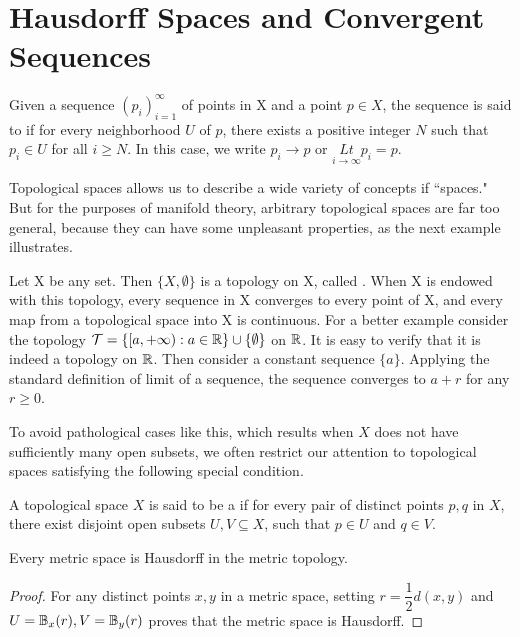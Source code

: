 \documentclass[11pt,a4paper]{article}
\begin{document}
\section{Hausdorff Spaces and Convergent Sequences}

\begin{mydef}
    Given a sequence $(p_i)_{i=1}^\infty$ of points in X and a point $p\in X$, the sequence is said to  if for every neighborhood $U$ of $p$, there exists a positive integer $N$ such that $p_i\in U$ for all $i\ge N$. In this case, we write $p_i\rightarrow p$ or $\underset{i\rightarrow\infty}{Lt} p_i=p$.
\end{mydef}

Topological spaces allows us to describe a wide variety of concepts if ``spaces." But for the purposes of manifold theory, arbitrary topological spaces are far too general, because they can have some unpleasant properties, as the next example illustrates.

\begin{example}
    Let X be any set. Then $\{X,\emptyset\}$ is a topology on X, called . When X is endowed with this topology, every sequence in X converges to every point of X, and every map from a topological space into X is continuous. For a better example consider the topology $\mathcal{T} = \{[a,+\infty):a\in\mathbb{R}\}\cup \{\emptyset\}$ on $\mathbb{R}$. It is easy to verify that it is indeed a topology on $\mathbb{R}$. Then consider a constant sequence $\{a\}$. Applying the standard definition of limit of a sequence, the sequence converges to $a+r$ for any $r\ge 0$.
\end{example}

To avoid pathological cases like this, which results when $X$ does not have sufficiently many open subsets, we often restrict our attention to topological spaces satisfying the following special condition.

\begin{mydef}
A topological space $X$ is said to be a  if for every pair of distinct points $p,q$ in $X$, there exist disjoint open subsets $U,V\subseteq X$, such that $p\in U$ and $q\in V$.
\end{mydef}

\begin{prop}
Every metric space is Hausdorff in the metric topology.
\end{prop}

\begin{proof}
    For any distinct points $x,y$ in a metric space, setting $r = \dfrac{1}{2}d(x,y)$ and $U = \mathbb{B}_x(r), V = \mathbb{B}_y(r)$ proves that the metric space is Hausdorff. 
\end{proof}
\end{document}
